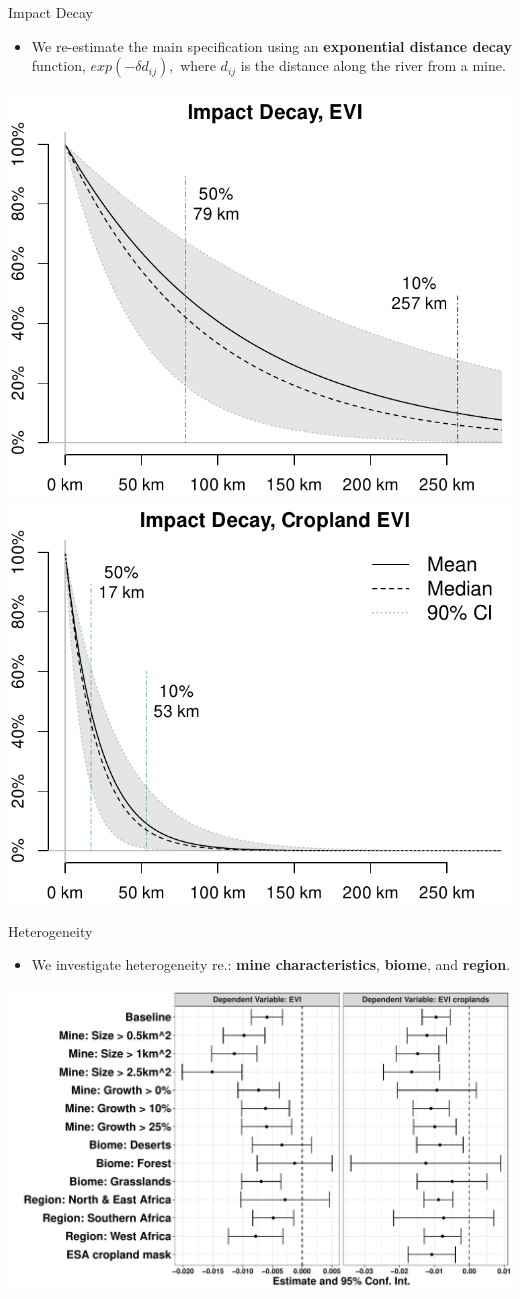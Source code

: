 \documentclass[aspectratio=169,11pt,dvipsnames, handout]{beamer}
\begin{document}
\begin{frame}{Impact Decay}
\label{frame:decay}
\begin{itemize}
    \item We re-estimate the main specification using an \textbf{exponential distance decay} function, \(exp(-\delta d_{ij}),\) where $d_{ij}$ is the distance along the river from a mine. \centering\hyperlink{frame:appdecay}{} 
\end{itemize}
    
    \pause
    \vspace{0.5em}
    
    \centering
    \includegraphics[width=.48\linewidth, page = 1]{img/effect-decay_EVI.pdf} \hfill
    \includegraphics[width=.48\linewidth, page = 1]{img/effect-decay_EVI-c.pdf}

\end{frame}





\begin{frame}{Heterogeneity}
\begin{itemize}
    \item We investigate heterogeneity re.: \textbf{mine characteristics}, \textbf{biome}, and \textbf{region}.
\end{itemize}
    
    \pause
    \vspace{0.5em}
    
    \centering
    \includegraphics[width=0.70\linewidth]{img/plot_heterogeneity_presentation.pdf}
\end{frame}
\end{document}
